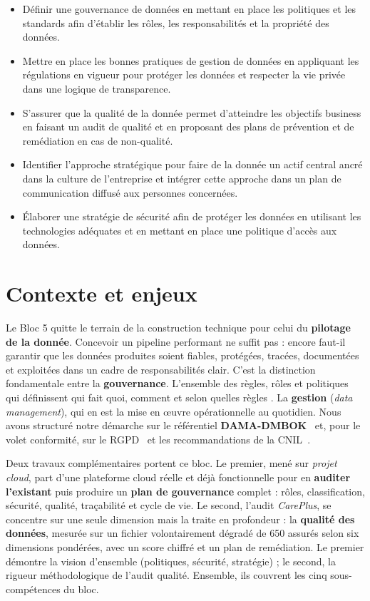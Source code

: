 \documentclass[11pt]{article}
\begin{document}
\begin{itemize}
    \item Définir une gouvernance de données en mettant en place les politiques et
          les standards afin d'établir les rôles, les responsabilités et la propriété des
          données.
    \item Mettre en place les bonnes pratiques de gestion de données en appliquant
          les régulations en vigueur pour protéger les données et respecter la vie privée
          dans une logique de transparence.
    \item S'assurer que la qualité de la donnée permet d'atteindre les objectifs
          business en faisant un audit de qualité et en proposant des plans de prévention
          et de remédiation en cas de non-qualité.
    \item Identifier l'approche stratégique pour faire de la donnée un actif central
          ancré dans la culture de l'entreprise et intégrer cette approche dans un plan de
          communication diffusé aux personnes concernées.
    \item Élaborer une stratégie de sécurité afin de protéger les données en
          utilisant les technologies adéquates et en mettant en place une politique
          d'accès aux données.
\end{itemize}

\section{Contexte et enjeux}

Le Bloc 5 quitte le terrain de la construction technique pour celui du
\textbf{pilotage de la donnée}. Concevoir un pipeline performant ne suffit pas :
encore faut-il garantir que les données produites soient fiables, protégées,
tracées, documentées et exploitées dans un cadre de responsabilités clair. C'est
la distinction fondamentale entre la \textbf{gouvernance}. L'ensemble des
règles, rôles et politiques qui définissent \og qui fait quoi, comment et selon
quelles règles \fg{}. La \textbf{gestion} (\textit{data management}), qui en
est la mise en œuvre opérationnelle au quotidien. Nous avons structuré notre
démarche sur le référentiel \textbf{DAMA-DMBOK}~\cite{dama} et, pour le volet
conformité, sur le RGPD~\cite{rgpd} et les recommandations de la CNIL~\cite{cnil}.

Deux travaux complémentaires portent ce bloc. Le premier, mené sur
\textit{projet cloud}, part d'une plateforme cloud réelle et déjà fonctionnelle
pour en \textbf{auditer l'existant} puis produire un \textbf{plan de gouvernance}
complet : rôles, classification, sécurité, qualité, traçabilité et cycle de vie.
Le second, l'audit \textit{CarePlus}, se concentre sur une seule dimension mais la
traite en profondeur : la \textbf{qualité des données}, mesurée sur un fichier
volontairement dégradé de 650 assurés selon six dimensions pondérées, avec un score
chiffré et un plan de remédiation. Le premier démontre la vision d'ensemble
(politiques, sécurité, stratégie) ; le second, la rigueur méthodologique de l'audit
qualité. Ensemble, ils couvrent les cinq sous-compétences du bloc.
\end{document}

